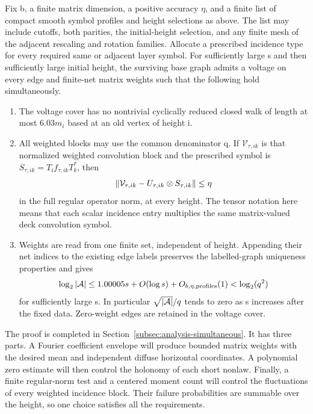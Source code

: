 \begin{proposition}
\label{prop:sampled-symbols}
Fix b, a finite matrix dimension, a positive accuracy \(\eta\), and a finite
list of compact smooth symbol profiles and height selections as above.  The
list may include cutoffs, both parities, the initial-height selection, and any
finite mesh of the adjacent rescaling and rotation families.  Allocate a
prescribed incidence type for every required same or adjacent layer symbol.
For sufficiently large s and then sufficiently large initial height, the
surviving base graph admits a voltage on every edge and finite-net matrix weights
such that the following hold simultaneously.
\begin{enumerate}
\item The voltage cover has no nontrivial cyclically reduced closed walk of
length at most \(6.03m_i\) based at an old vertex of height i.
\item All weighted blocks may use the common denominator q.  If
\(\mathcal V_{\tau,ik}\) is that normalized weighted convolution block and
the prescribed symbol is \(S_{\tau,ik}=T_if_{\tau,ik}T_k^*\), then
\[
 \left\lVert\mathcal V_{\tau,ik}
           -U_{\tau,ik}\otimes S_{\tau,ik}\right\rVert\leq\eta
\]
in the full regular operator norm, at every height.  The tensor notation here
means that each scalar incidence entry multiplies the same matrix-valued deck
convolution symbol.
\item Weights are read from one finite set, independent of height.  Appending
their net indices to the existing edge labels preserves the labelled-graph
uniqueness properties and gives
\[
 \log_2\left\lvert\mathcal A\right\rvert
 \leq1.00005s+O(\log s)+O_{b,\eta,\mathrm{profiles}}(1)
 <\log_2(q^2)
\]
for sufficiently large s.  In particular \(\sqrt{\left\lvert\mathcal A\right\rvert}/q\)
tends to zero as s increases after the fixed data.  Zero-weight edges are
retained in the voltage cover.
\end{enumerate}
\end{proposition}

The proof is completed in Section~\ref{subsec:analysis-simultaneous}.
It has three parts.  A Fourier coefficient envelope will produce bounded
matrix weights with the desired mean and independent diffuse horizontal
coordinates.  A polynomial zero estimate will then control the holonomy of
each short nonlaw.  Finally, a finite regular-norm test and a centered moment
count will control the fluctuations of every weighted incidence block.
Their failure probabilities are summable over the height, so one choice
satisfies all the requirements.

